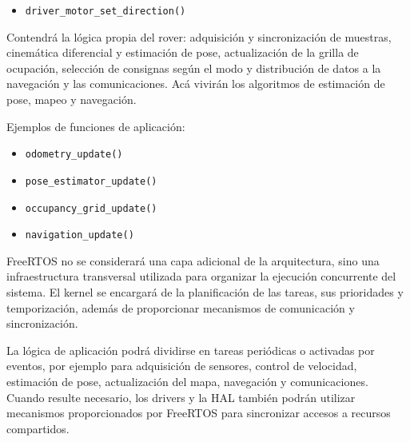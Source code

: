 \begin{description}
\begin{visar}
\begin{itemize}
  \item \texttt{driver\_motor\_set\_direction()}

\end{itemize}
        \end{visar}


  \item[Capa 3 --- Aplicación.]
        Contendrá la lógica propia del rover: adquisición y sincronización de
        muestras, cinemática diferencial y estimación de pose, actualización
        de la grilla de ocupación, selección de consignas según el modo y
        distribución de datos a la navegación y las comunicaciones. Acá
        vivirán los algoritmos de estimación de pose, mapeo y navegación.

        \begin{visar}
Ejemplos de funciones de aplicación:
\begin{itemize}

  \item \texttt{odometry\_update()} 



  \item \texttt{pose\_estimator\_update()}

  \item \texttt{occupancy\_grid\_update()} 

  \item \texttt{navigation\_update()} 

\end{itemize}
        \end{visar}


  \item[Infraestructura transversal --- FreeRTOS.]
        FreeRTOS no se considerará una capa adicional de la arquitectura, sino
        una infraestructura transversal utilizada para organizar la ejecución
        concurrente del sistema. El kernel se encargará de la planificación de
        las tareas, sus prioridades y temporización, además de proporcionar
        mecanismos de comunicación y sincronización.

        La lógica de aplicación podrá dividirse en tareas periódicas o
        activadas por eventos, por ejemplo para adquisición de sensores,
        control de velocidad, estimación de pose, actualización del mapa,
        navegación y comunicaciones. Cuando resulte necesario, los drivers y
        la HAL también podrán utilizar mecanismos proporcionados por FreeRTOS
        para sincronizar accesos a recursos compartidos.

        

\end{description}

